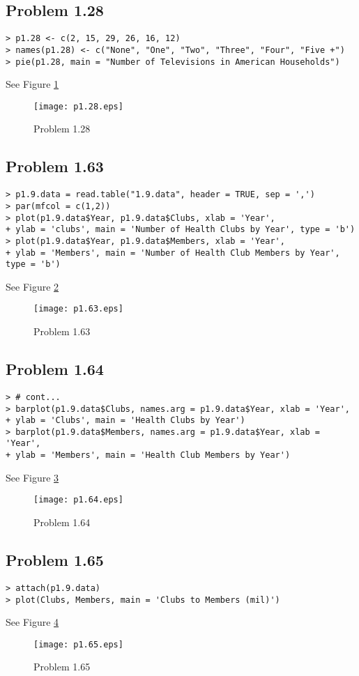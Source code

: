 \documentclass{article}
\begin{document}
\subsection{Problem 1.28}
\begin{verbatim}
> p1.28 <- c(2, 15, 29, 26, 16, 12)
> names(p1.28) <- c("None", "One", "Two", "Three", "Four", "Five +")
> pie(p1.28, main = "Number of Televisions in American Households")
\end{verbatim}
	See Figure \ref{p1.28}
	\begin{figure}[!htb]
	  \centering
	  \texttt{[image: p1.28.eps]}
	  \caption{Problem 1.28 \label{p1.28}}
	\end{figure}


\subsection{Problem 1.63}
\begin{verbatim}
> p1.9.data = read.table("1.9.data", header = TRUE, sep = ',')
> par(mfcol = c(1,2))
> plot(p1.9.data$Year, p1.9.data$Clubs, xlab = 'Year', 
+ ylab = 'clubs', main = 'Number of Health Clubs by Year', type = 'b')
> plot(p1.9.data$Year, p1.9.data$Members, xlab = 'Year', 
+ ylab = 'Members', main = 'Number of Health Club Members by Year', type = 'b')
\end{verbatim}
	See Figure \ref{p1.63}
	\begin{figure}[!htb]
	  \centering
	  \texttt{[image: p1.63.eps]}
	  \caption{Problem 1.63 \label{p1.63}}
	\end{figure}

\subsection{Problem 1.64}
\begin{verbatim}
> # cont...
> barplot(p1.9.data$Clubs, names.arg = p1.9.data$Year, xlab = 'Year', 
+ ylab = 'Clubs', main = 'Health Clubs by Year')
> barplot(p1.9.data$Members, names.arg = p1.9.data$Year, xlab = 'Year', 
+ ylab = 'Members', main = 'Health Club Members by Year')
\end{verbatim}
	See Figure \ref{p1.64}
	\begin{figure}[!htb]
	  \centering
	  \texttt{[image: p1.64.eps]}
	  \caption{Problem 1.64 \label{p1.64}}
	\end{figure}

\subsection{Problem 1.65}
\begin{verbatim}
> attach(p1.9.data)
> plot(Clubs, Members, main = 'Clubs to Members (mil)')
\end{verbatim}
	See Figure \ref{p1.65}
	\begin{figure}[!htb]
	  \centering
	  \texttt{[image: p1.65.eps]}
	  \caption{Problem 1.65 \label{p1.65}}
	\end{figure}
\end{document}
